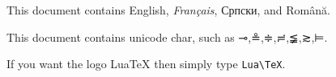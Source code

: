 \documentclass[a4paper]{article}
\begin{document}
This document contains English, \textit{Français}, Српски,
and Rom\^an\u{a}.

This document contains unicode char, such as ⊸,≗,≑,≓,≨,≳,⊨.

{\sffamily
If you want the logo {Lua\TeX} then simply type \verb|Lua\TeX|.}
\end{document}
